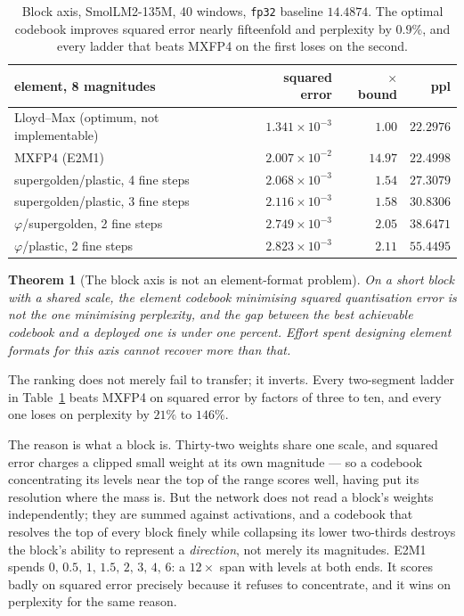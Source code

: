 \documentclass[11pt]{article}
\newtheorem{theorem}{Theorem}
\theoremstyle{definition}
\begin{document}
\begin{table}[t]\centering
\caption{Block axis, SmolLM2-135M, 40 windows, \texttt{fp32} baseline $14.4874$.
The optimal codebook improves squared error nearly fifteenfold and perplexity by
$0.9\%$, and every ladder that beats MXFP4 on the first loses on the second.}
\label{tab:blockbound}
\begin{tabular}{lrrr}
\toprule
element, 8 magnitudes & squared error & $\times$ bound & ppl \\
\midrule
Lloyd--Max (optimum, not implementable) & $1.341\!\times\!10^{-3}$ & $1.00$ & $\mathbf{22.2976}$ \\
MXFP4 (E2M1)                            & $2.007\!\times\!10^{-2}$ & $14.97$ & $\mathbf{22.4998}$ \\
supergolden/plastic, 4 fine steps       & $2.068\!\times\!10^{-3}$ & $1.54$ & $27.3079$ \\
supergolden/plastic, 3 fine steps       & $2.116\!\times\!10^{-3}$ & $1.58$ & $30.8306$ \\
$\varphi$/supergolden, 2 fine steps     & $2.749\!\times\!10^{-3}$ & $2.05$ & $38.6471$ \\
$\varphi$/plastic, 2 fine steps         & $2.823\!\times\!10^{-3}$ & $2.11$ & $55.4495$ \\
\bottomrule
\end{tabular}
\end{table}

\begin{theorem}[The block axis is not an element-format problem]\label{thm:block}
On a short block with a shared scale, the element codebook minimising squared
quantisation error is not the one minimising perplexity, and the gap between the
best achievable codebook and a deployed one is under one percent. Effort spent
designing element formats for this axis cannot recover more than that.
\end{theorem}

The ranking does not merely fail to transfer; it inverts. Every two-segment
ladder in Table~\ref{tab:blockbound} beats MXFP4 on squared error by factors of
three to ten, and every
one loses on perplexity by $21\%$ to $146\%$.

The reason is what a block is. Thirty-two weights share one scale, and squared
error charges a clipped small weight at its own magnitude --- so a codebook
concentrating its levels near the top of the range scores well, having put its
resolution where the mass is. But the network does not read a block's weights
independently; they are summed against activations, and a codebook that
resolves the top of every block finely while collapsing its lower two-thirds
destroys the block's ability to represent a \emph{direction}, not merely its
magnitudes. E2M1 spends $0,\,0.5,\,1,\,1.5,\,2,\,3,\,4,\,6$: a $12\times$ span
with levels at both ends. It scores badly on squared error precisely because it
refuses to concentrate, and it wins on perplexity for the same reason.
\end{document}
